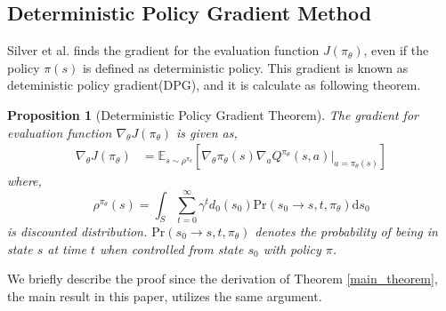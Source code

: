 \documentclass[english, dvipdfmx]{ampmt}             %
\newcommand{\expect}{\mathbb{E}}
\newtheorem{prop.}{Proposition}
\begin{document}
\subsection{Deterministic Policy Gradient Method}
Silver et al.\cite{DPG} finds the gradient for the evaluation function $J(\pi_{\theta})$, even if the policy $\pi(s)$ is defined as deterministic policy. This gradient is known as deteministic policy gradient(DPG), and it is calculate as following theorem.
\begin{prop.}[Deterministic Policy Gradient Theorem]
The gradient for evaluation function $\nabla_{\theta}J(\pi_{\theta})$ is given as, 
\begin{align}
	\nabla_{\theta}J(\pi_{\theta}) &= \expect_{s\sim\rho^{\pi_{\theta}}}[
	\nabla_{\theta}\pi_{\theta}(s)\nabla_{a}Q^{\pi_{\theta}}(s, a)|_{a=\pi_{\theta}(s)}] \label{true_pg} 
\end{align}
where, 
\begin{equation}
	\rho^{\pi_{\theta}}(s) = \int_{S}\sum_{t=0}^{\infty}\gamma^td_0(s_0)\textrm{Pr}(s_0\to s, t,  \pi_{\theta})\textrm{d}s_0
\end{equation}
is discounted distribution. $\textrm{Pr}(s_0\to s, t,  \pi_{\theta})$ denotes the probability of being in state $s$ at time $t$ when controlled from state $s_0$ with policy $\pi$.
\end{prop.}
We briefly describe the proof since the derivation of Theorem \ref{main_theorem}, the main result in this paper, utilizes the same argument.
\end{document}
